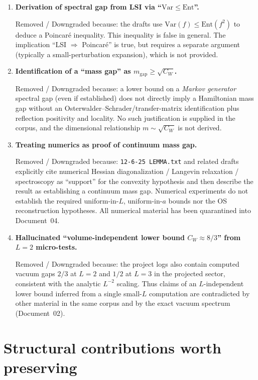 \documentclass[11pt]{article}
\begin{document}
\begin{enumerate}[leftmargin=*]
\item \textbf{Derivation of spectral gap from LSI via ``$\mathrm{Var}\le \mathrm{Ent}$''.}

Removed / Downgraded because:
the drafts use $\mathrm{Var}(f)\le \mathrm{Ent}(f^2)$ to deduce a Poincar\'e inequality.
This inequality is false in general.  The implication ``LSI $\Rightarrow$ Poincar\'e'' is true, but requires a separate argument (typically a small-perturbation expansion), which is not provided.

\item \textbf{Identification of a ``mass gap'' as $m_{\mathrm{gap}}\ge \sqrt{C_W}$.}

Removed / Downgraded because:
a lower bound on a \emph{Markov generator} spectral gap (even if established) does not directly imply a Hamiltonian mass gap without an Osterwalder--Schrader/transfer-matrix identification plus reflection positivity and locality.
No such justification is supplied in the corpus, and the dimensional relationship $m\sim \sqrt{C_W}$ is not derived.

\item \textbf{Treating numerics as proof of continuum mass gap.}

Removed / Downgraded because:
\texttt{12-6-25 LEMMA.txt} and related drafts explicitly cite numerical Hessian diagonalization / Langevin relaxation / spectroscopy as ``support'' for the convexity hypothesis and then describe the result as establishing a continuum mass gap.
Numerical experiments do not establish the required uniform-in-$L$, uniform-in-$a$ bounds nor the OS reconstruction hypotheses.
All numerical material has been quarantined into Document~04.

\item \textbf{Hallucinated ``volume-independent lower bound $C_W\approx 8/3$'' from $L=2$ micro-tests.}

Removed / Downgraded because:
the project logs also contain computed vacuum gaps $2/3$ at $L=2$ and $1/2$ at $L=3$ in the projected sector, consistent with the analytic $L^{-2}$ scaling.
Thus claims of an $L$-independent lower bound inferred from a single small-$L$ computation are contradicted by other material in the same corpus and by the exact vacuum spectrum (Document~02).
\end{enumerate}

\section{Structural contributions worth preserving}
\end{document}
